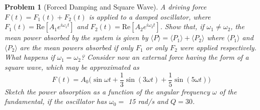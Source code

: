 \documentclass[a4paper]{article}
\theoremstyle{new}
\newtheorem{qns}{Problem}[section]
\begin{document}
\newpage
\begin{qns}[Forced Damping and Square Wave]
A driving force $F(t) = F_1(t) + F_2(t)$ is applied to a damped oscillator, where $F_1(t) =\text{Re}[A_1e^{i\omega_1t}]$ and $F_2(t)=\text{Re}[A_2e^{i\omega_2t}]$. Show that, if $\omega_1\neq\omega_2$, the mean power absorbed by the system is given by $\langle P\rangle=\langle P_1\rangle+\langle P_2\rangle$ where $\langle P_1\rangle$ and $\langle P_2\rangle$ are the mean powers absorbed if only $F_1$ or only $F_2$ were applied respectively. What happens if $\omega_1=\omega_2$? Consider now an external force having the form of a square wave, which may be approximated as
$$F(t)=A_0\bigg(\sin\omega t+\frac{1}{3}\sin(3\omega t)+\frac{1}{5}\sin(5\omega t)\bigg)$$
Sketch the power absorption as a function of the angular frequency $\omega$ of the fundamental, if the oscillator has $\omega_0=$ 15 rad/s and $Q = 30$.
\end{qns}
\end{document}
